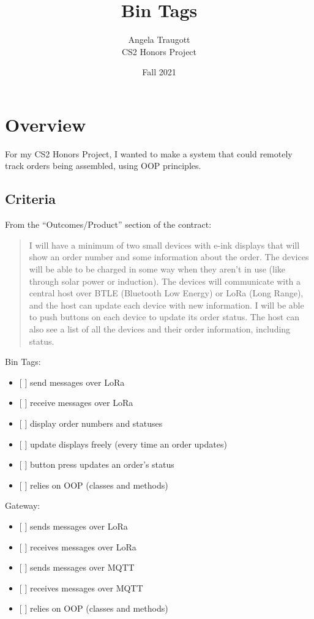 \documentclass{article}
\title{Bin Tags}
\author{Angela Traugott\\CS2 Honors Project}
\date{Fall 2021}
\begin{document}
\maketitle

\section{Overview}\label{overview}

For my CS2 Honors Project, I wanted to make a system that could remotely
track orders being assembled, using OOP principles.~

\subsection{Criteria}\label{criteria}

From the ``Outcomes/Product'' section of the contract:~

\begin{quote}
I will have a minimum of two small devices with e-ink displays that will
show an order number and some information about the order. The devices
will be able to be charged in some way when they aren't in use (like
through solar power or induction). The devices will communicate with a
central host over BTLE (Bluetooth Low Energy) or LoRa (Long Range), and
the host can update each device with new information. I will be able to
push buttons on each device to update its order status. The host can
also see a list of all the devices and their order information,
including status.
\end{quote}

Bin Tags:

\begin{itemize}
\item
  {[} {]} send messages over LoRa
\item
  {[} {]} receive messages over LoRa
\item
  {[} {]} display order numbers and statuses
\item
  {[} {]} update displays freely (every time an order updates)
\item
  {[} {]} button press updates an order's status
\item
  {[} {]} relies on OOP (classes and methods)
\end{itemize}

Gateway:

\begin{itemize}
\item
  {[} {]} sends messages over LoRa
\item
  {[} {]} receives messages over LoRa
\item
  {[} {]} sends messages over MQTT
\item
  {[} {]} receives messages over MQTT
\item
  {[} {]} relies on OOP (classes and methods)
\end{itemize}
\end{document}
